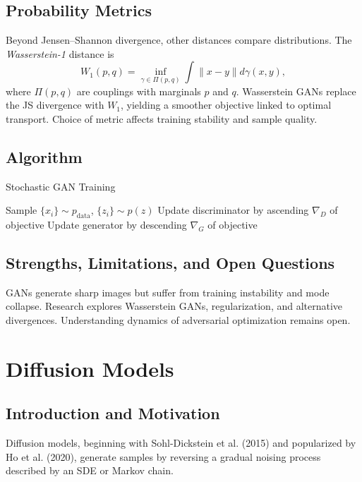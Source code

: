 \subsection{Probability Metrics}
Beyond Jensen--Shannon divergence, other distances compare distributions. The \emph{Wasserstein-1} distance \cite{villani2003} is
\begin{equation}
W_1(p,q)=\inf_{\gamma\in\Pi(p,q)} \int \|x-y\| d\gamma(x,y),
\end{equation}
where $\Pi(p,q)$ are couplings with marginals $p$ and $q$. Wasserstein GANs replace the JS divergence with $W_1$, yielding a smoother objective linked to optimal transport. Choice of metric affects training stability and sample quality.

\subsection{Algorithm}
\begin{algorithm}
\caption{Stochastic GAN Training}
\begin{algorithmic}[1]
    \STATE Sample $\{x_i\}\sim p_{\text{data}}$, $\{z_i\}\sim p(z)$
    \STATE Update discriminator by ascending $\nabla_D$ of objective
    \STATE Update generator by descending $\nabla_G$ of objective
\ENDFOR
\end{algorithmic}
\end{algorithm}

\subsection{Strengths, Limitations, and Open Questions}
GANs generate sharp images but suffer from training instability and mode collapse. Research explores Wasserstein GANs, regularization, and alternative divergences. Understanding dynamics of adversarial optimization remains open.

\section{Diffusion Models}
\subsection{Introduction and Motivation}
Diffusion models, beginning with Sohl-Dickstein et al. (2015) and popularized by Ho et al. (2020), generate samples by reversing a gradual noising process described by an SDE or Markov chain.

